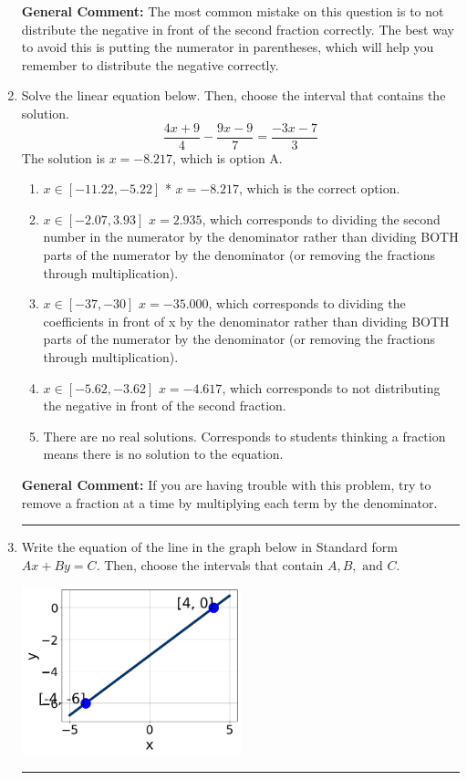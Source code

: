 \documentclass{extbook}[14pt]
\newcommand{\litem}[1]{\item #1

\rule{\textwidth}{0.4pt}}
\begin{document}
\begin{enumerate}
{\textbf{General Comment:} The most common mistake on this question is to not distribute the negative in front of the second fraction correctly. The best way to avoid this is putting the numerator in parentheses, which will help you remember to distribute the negative correctly.
}
\litem{
Solve the linear equation below. Then, choose the interval that contains the solution.
\[ \frac{4x + 9}{4} - \frac{9x -9}{7} = \frac{-3x -7}{3} \]
The solution is \( x = -8.217 \), which is option A.\begin{enumerate}[label=\Alph*.]
\item \( x \in [-11.22, -5.22] \)
* $x = -8.217$, which is the correct option.
\item \( x \in [-2.07, 3.93] \)
 $x = 2.935$, which corresponds to dividing the second number in the numerator by the denominator rather than dividing BOTH parts of the numerator by the denominator (or removing the fractions through multiplication).
\item \( x \in [-37, -30] \)
 $x = -35.000$, which corresponds to dividing the coefficients in front of x by the denominator rather than dividing BOTH parts of the numerator by the denominator (or removing the fractions through multiplication).
\item \( x \in [-5.62, -3.62] \)
 $x = -4.617$, which corresponds to not distributing the negative in front of the second fraction.
\item \( \text{There are no real solutions.} \)
Corresponds to students thinking a fraction means there is no solution to the equation.
\end{enumerate}

\textbf{General Comment:} If you are having trouble with this problem, try to remove a fraction at a time by multiplying each term by the denominator.
}
\litem{
Write the equation of the line in the graph below in Standard form $Ax+By=C$. Then, choose the intervals that contain $A, B, \text{ and } C$.

\begin{center}
    \includegraphics[width=0.5\textwidth]{../Figures/linearGraphToStandardCopyC.png}
\end{center}

}
\end{enumerate}
\end{document}
